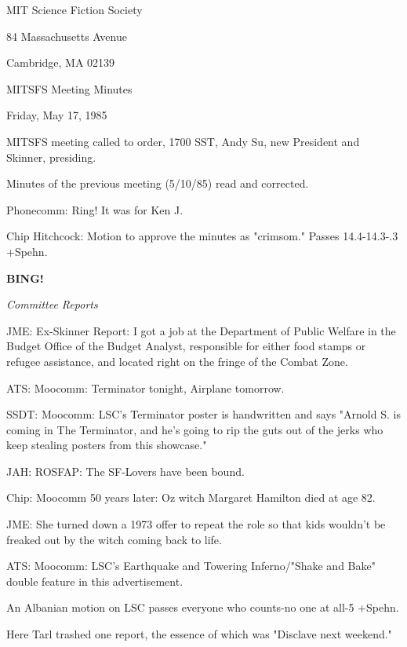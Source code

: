 \documentclass[12pt]{article}
\newcommand{\bing}{{\bf BING!} }
\newcommand{\goto}[1]{\bing \vskip 12pt \centerline{{\em{#1}}}}
\begin{document}
\begin{center}

MIT Science Fiction Society 

84 Massachusetts Avenue

Cambridge, MA 02139

\vspace{12pt}

MITSFS Meeting Minutes 

Friday, May 17, 1985

\end{center}
 
\vspace{18pt}

\setlength{\parskip}{6pt}

\noindent
MITSFS meeting called to order, 1700 SST,
Andy Su, new President and Skinner, presiding.

Minutes of the previous meeting (5/10/85) read and corrected.

Phonecomm: Ring! It was for Ken J.

Chip Hitchcock: Motion to approve the minutes as "crimsom." Passes 14.4-14.3-.3 +Spehn.

\goto{Committee Reports}

JME: Ex-Skinner Report: I got a job at the Department of Public Welfare in the Budget Office of the Budget Analyst, responsible for either food stamps or refugee assistance, and located right on the fringe of the Combat Zone.

ATS: Moocomm: Terminator tonight, Airplane tomorrow.

SSDT: Moocomm: LSC's Terminator poster is handwritten and says "Arnold S. is coming in The Terminator, and he's going to rip the guts out of the jerks who keep stealing posters from this showcase."

JAH: ROSFAP: The SF-Lovers have been bound.

Chip: Moocomm 50 years later: Oz witch Margaret Hamilton died at age 82.

JME: She turned down a 1973 offer to repeat the role so that kids wouldn't be freaked out by the witch coming back to life.

ATS: Moocomm: LSC's Earthquake and Towering Inferno/"Shake and Bake" double feature in this advertisement.

An Albanian motion on LSC passes everyone who counts-no one at all-5 +Spehn.

Here Tarl trashed one report, the essence of which was "Disclave next weekend."
\end{document}
